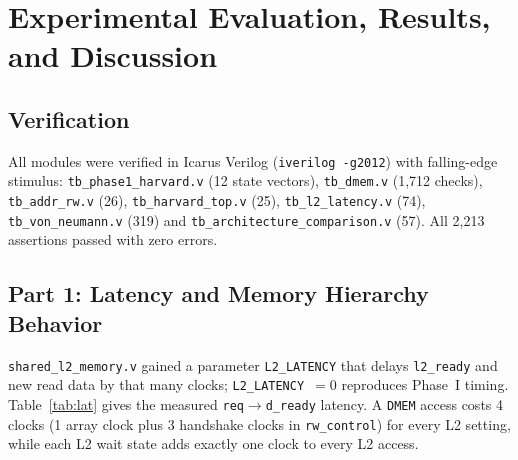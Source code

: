 \documentclass[conference]{IEEEtran}
\begin{document}
\begin{table}[htbp]
\caption{32-Bit Harvard Address Map and Decoding Configuration}
\begin{center}
\end{center}
\end{table}

\section{Experimental Evaluation, Results, and Discussion}
\subsection{Verification}
All modules were verified in Icarus Verilog (\texttt{iverilog -g2012}) with falling-edge stimulus: \texttt{tb\_phase1\_harvard.v} (12 state vectors), \texttt{tb\_dmem.v} (1,712 checks), \texttt{tb\_addr\_rw.v} (26), \texttt{tb\_harvard\_top.v} (25), \texttt{tb\_l2\_latency.v} (74), \texttt{tb\_von\_neumann.v} (319) and \texttt{tb\_architecture\_comparison.v} (57). All 2,213 assertions passed with zero errors.

\subsection{Part 1: Latency and Memory Hierarchy Behavior}
\texttt{shared\_l2\_memory.v} gained a parameter \texttt{L2\_LATENCY} that delays \texttt{l2\_ready} and new read data by that many clocks; \texttt{L2\_LATENCY}~$=0$ reproduces Phase~I timing. Table~\ref{tab:lat} gives the measured \texttt{req}$\rightarrow$\texttt{d\_ready} latency. A \texttt{DMEM} access costs 4 clocks (1 array clock plus 3 handshake clocks in \texttt{rw\_control}) for every L2 setting, while each L2 wait state adds exactly one clock to every L2 access.
\end{document}
